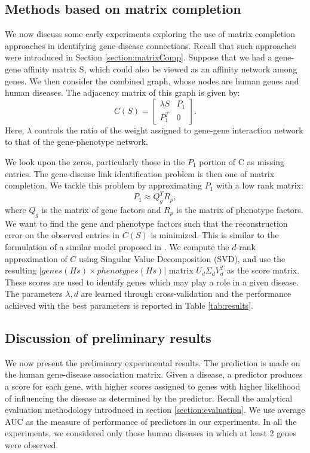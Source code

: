 \subsection{Methods based on matrix completion}
We now discuss some early experiments exploring the use of matrix completion approaches in identifying gene-disease connections. Recall that such approaches were introduced in Section \ref{section:matrixComp}. Suppose that we had a gene-gene affinity matrix S, which could also be viewed as an affinity network among genes. We then consider the combined graph, whose nodes are human genes and human diseases. The adjacency matrix of this graph is given by: 
$$C(S) = \begin{bmatrix}\lambda S & P_1 \\P_1^T & 0 \end{bmatrix}. \label{eqn:C}$$
Here, $\lambda$ controls the ratio of the weight assigned to gene-gene interaction network to that of the gene-phenotype network.

We look upon the zeros, particularly those in the $P_1$ portion of C as missing entries. The gene-disease link identification problem is then one of matrix completion. We tackle this problem by approximating $P_1$ with a low rank matrix: $$P_1 \approx Q_g^T R_p,$$ where $Q_g$ is the matrix of gene factors and $R_p$ is the matrix of phenotype factors. We want to find the gene and phenotype factors such that the reconstruction error on the observed entries in $C(S)$ is minimized. This is similar to the formulation of a similar model proposed in \cite{vasukiNatarajan}. We compute the $d$-rank approximation of $C$ using Singular Value Decomposition (SVD), and use the resulting $|genes(Hs) \times phenotypes(Hs)|$ matrix $U_d \Sigma_d V_d^T$ as the score matrix. These scores are used to identify genes which may play a role in a given disease. The parameters $\lambda, d$ are learned through cross-validation and the performance achieved with the best parameters is reported in Table \ref{tab:results}.

\subsection{Discussion of preliminary results}
We now present the preliminary experimental results. The prediction is made on the human gene-disease association matrix. Given a disease, a predictor produces a score for each gene, with higher scores assigned to genes with higher likelihood of influencing the disease as determined by the predictor. Recall the analytical evaluation methodology introduced in section \ref{section:evaluation}. We use average AUC as the measure of performance of predictors in our experiments. In all the experiments, we considered only those human diseases in which at least 2 genes were observed.

